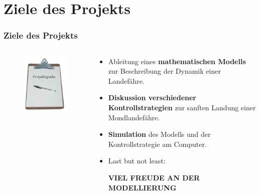 \documentclass{beamer}
\begin{document}
	\section{Ziele des Projekts}
	
		\begin{frame}
			\frametitle{Ziele des Projekts}
			\begin{columns}
				\begin{column}{0.48\textwidth}
					\begin{figure}
						\includegraphics[scale = 0.53]{images/projektziele.jpg}	
					\end{figure}
				\end{column}
				\begin{column}{0.58\textwidth}
					\begin{itemize}
						\item Ableitung eines \textbf{mathematischen Modells} zur Beschreibung der Dynamik einer Landefähre.
						\item \textbf{Diskussion verschiedener Kontrollstrategien} zur sanften Landung einer Mondlandefähre.
						\item \textbf{Simulation} des Modells und der Kontrollstrategie am Computer.
						\item Last but not least:
						\pause
						\newline
						\begin{center}
							\large
							\textbf{VIEL FREUDE AN DER MODELLIERUNG}
						\end{center}
					\end{itemize}
				\end{column}

			\end{columns}
		\end{frame}
\end{document}
